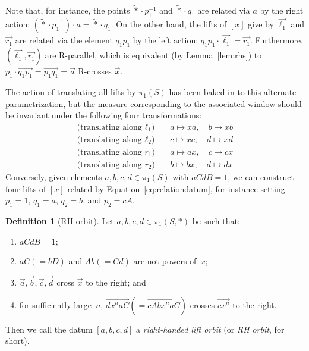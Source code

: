 \documentclass[11pt]{amsart}
\newcommand{\ora}[1]{\overrightarrow{#1}}
\numberwithin{equation}{section}
\numberwithin{figure}{section}
\theoremstyle{definition}
\newtheorem{definition}[theorem]{Definition}
\theoremstyle{plain}
\newcommand*{\wt}[1]{\widetilde{#1}}
\begin{document}
Note that, for instance, the points $\wt \ast \cdot p_1^{-1}$ and $\wt \ast \cdot q_1$ are related via $a$ by the right action: $(\wt \ast \cdot p_1^{-1}) \cdot a = \wt \ast \cdot q_1$.
On the other hand, the lifts of $[x]$ give by $\ora{\ell_1}$ and
$\ora{r_1}$ are related via the element $q_1 p_1$ by the left action:
$q_1 p_1 \cdot \ora{\ell_1} = \ora{r_1}$. Furthermore, $(\ora{\ell_1},\ora{r_1})$ are R-parallel, which is equivalent (by Lemma~\ref{lem:rhs}) to $p_1 \cdot \ora{q_1 p_1} = \ora{p_1 q_1} = \ora{a}$ R-crosses $\ora{x}$.

The action of translating all lifts by $\pi_1(S)$ has been baked in to
this alternate parametrization,
but the measure corresponding to the associated window should be
invariant under the following four transformations:
\begin{subequations}\label{eq:translations}
\begin{align}
\text{(translating along $\ell_1$)} \quad & a \mapsto xa,\quad b \mapsto xb \label{eq:translations-l1}\\
\text{(translating along $\ell_2$)} \quad & c \mapsto xc,\quad d \mapsto xd \label{eq:translations-l2}\\
\text{(translating along $r_1$)} \quad & a \mapsto ax,\quad c \mapsto cx \label{eq:translations-r1}\\
\text{(translating along $r_2$)} \quad & b \mapsto bx,\quad d \mapsto dx \label{eq:translations-r2}
\end{align}
\end{subequations}
Conversely, given elements $a,b,c,d \in \pi_1(S)$ with
$aCdB = 1$, we can
construct four lifts of $[x]$ related by Equation~\eqref{eq:relationdatum}, for instance
setting $p_1 = 1$, $q_1 = a$, $q_2 = b$, and $p_2 = cA$.


\begin{definition}[RH orbit]
\label{def:RH-lift-sys}
Let $a,b,c,d \in \pi_1(S,\ast)$ be such that:
\begin{enumerate}[label=(\arabic*${}'$),start=0]
\item\label{item:box-close} $a C d B = 1$;
\item\label{item:box-nontriv} $aC(=bD)$ and $Ab(=Cd)$ are not powers of~$x$;
\item\label{item:box-edges-cross} $\ora{a},\ora{b},\ora{c},\ora{d}$ cross $\ora{x}$ to the right; and
\item\label{item:box-diags-cross} for sufficiently large~$n$,
  $\ora{dx^na C}
  (= \ora{cAbx^na C})$ crosses
  $\ora{cx^n}$ to the right.
\end{enumerate}

Then we call the datum $[a,b,c,d]$ a \emph{right-handed lift orbit} (or \emph{RH orbit}, for short).
\end{definition}
\end{document}
